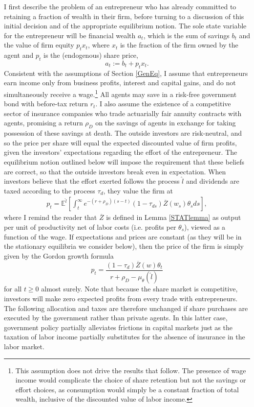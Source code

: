 \documentclass[11pt]{article}
\theoremstyle{plain}
\begin{document}
I first describe the problem of an entrepreneur who has already committed to retaining a fraction of wealth in their firm, before turning to a discussion of this initial decision and of the appropriate equilibrium notion. The sole state variable for the entrepreneur will be financial wealth $a_t$, which is the sum of savings $b_t$ and the value of firm equity $p_tx_t$, where $x_t$ is the fraction of the firm owned by the agent and $p_t$ is the (endogenous) share price, 
\begin{equation}
a_t := b_t + p_tx_t. 
\label{totalass}
\end{equation} 
Consistent with the assumptions of Section \ref{GenEq}, I assume that entrepreneurs earn income only from business profits, interest and capital gains, and do not simultaneously receive a wage.\footnote{This assumption does not drive the results that follow. The presence of wage income would complicate the choice of share retention but not the savings or effort choices, as consumption would simply be a constant fraction of total wealth, inclusive of the discounted value of labor income.} All agents may save in a risk-free government bond with before-tax return $r_t$. I also assume the existence of a competitive sector of insurance companies who trade actuarially fair annuity contracts with agents, promising a return $\rho_D$ on the savings of agents in exchange for taking possession of these savings at death. The outside investors are risk-neutral, and so the price per share will equal the expected discounted value of firm profits, given the investors' expectations regarding the effort of the entrepreneur. The equilibrium notion outlined below will impose the requirement that these beliefs are correct, so that the outside investors break even in expectation. When investors believe that the effort exerted follows the process $\hat{l}$ and dividends are taxed according to the process $\tau_d$, they value the firm at
\begin{align*}
p_t = \mathbb{E}^{\hat{l}}{\left[\int_t^{\infty}e^{-(r+\rho_D)(s-t)} (1-\tau_{ds})\overline{Z}(w_s) \theta_sds\right]},
\end{align*}
where I remind the reader that $\overline{Z}$ is defined in Lemma \ref{STATlemma} as output per unit of productivity net of labor costs (i.e. profits per $\theta_s$), viewed as a function of the wage. If expectations and prices are constant (as they will be in the stationary equilibria we consider below), then the price of the firm is simply given by the Gordon growth formula
\begin{equation}
p_t = \frac{(1-\tau_d)\overline{Z}(w)\theta_t}{r + \rho_D - \mu_{\theta}(\hat{l})}
\label{priceRE}
\end{equation}
for all $t\geq0$ almost surely. Note that because the share market is competitive, investors will make zero expected profits from every trade with entrepreneurs. The following allocation and taxes are therefore unchanged if share purchases are executed by the government rather than private agents. In this latter case, government policy partially alleviates frictions in capital markets just as the taxation of labor income partially substitutes for the absence of insurance in the labor market.
\end{document}
